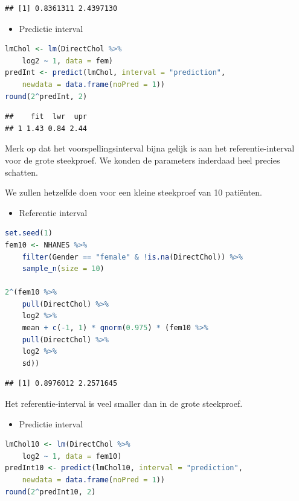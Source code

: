 \documentclass[
  12pt,dutch,coursenotes]{book}
\providecommand{\tightlist}{%
  \setlength{\itemsep}{0pt}\setlength{\parskip}{0pt}}
\begin{document}
\begin{lstlisting}
## [1] 0.8361311 2.4397130
\end{lstlisting}

\begin{itemize}
\tightlist
\item
  Predictie interval
\end{itemize}

\begin{lstlisting}[language=R]
lmChol <- lm(DirectChol %>%
    log2 ~ 1, data = fem)
predInt <- predict(lmChol, interval = "prediction",
    newdata = data.frame(noPred = 1))
round(2^predInt, 2)
\end{lstlisting}

\begin{lstlisting}
##    fit  lwr  upr
## 1 1.43 0.84 2.44
\end{lstlisting}

Merk op dat het voorspellingsinterval bijna gelijk is aan het referentie-interval voor de grote steekproef. We konden de parameters inderdaad heel precies schatten.

We zullen hetzelfde doen voor een kleine steekproef van 10 patiënten.

\begin{itemize}
\tightlist
\item
  Referentie interval
\end{itemize}

\begin{lstlisting}[language=R]
set.seed(1)
fem10 <- NHANES %>%
    filter(Gender == "female" & !is.na(DirectChol)) %>%
    sample_n(size = 10)

2^(fem10 %>%
    pull(DirectChol) %>%
    log2 %>%
    mean + c(-1, 1) * qnorm(0.975) * (fem10 %>%
    pull(DirectChol) %>%
    log2 %>%
    sd))
\end{lstlisting}

\begin{lstlisting}
## [1] 0.8976012 2.2571645
\end{lstlisting}

Het referentie-interval is veel smaller dan in de grote steekproef.

\begin{itemize}
\tightlist
\item
  Predictie interval
\end{itemize}

\begin{lstlisting}[language=R]
lmChol10 <- lm(DirectChol %>%
    log2 ~ 1, data = fem10)
predInt10 <- predict(lmChol10, interval = "prediction",
    newdata = data.frame(noPred = 1))
round(2^predInt10, 2)
\end{lstlisting}
\end{document}
